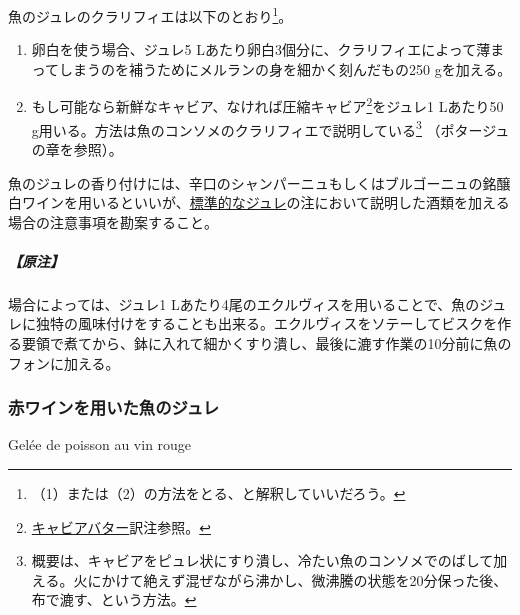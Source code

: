 \begin{recette}
魚のジュレのクラリフィエは以下のとおり\footnote{（1）または（2）の方法をとる、と解釈していいだろう。}。

\begin{enumerate}
\def\labelenumi{\arabic{enumi}.}
\item
  卵白を使う場合、ジュレ5
  Lあたり卵白3個分に、クラリフィエによって薄まってしまうのを補うためにメルランの身を細かく刻んだもの250
  gを加える。
\item
  もし可能なら新鮮なキャビア、なければ圧縮キャビア\footnote{\protect\hyperlink{beurre-de-caviar}{キャビアバター}訳注参照。}をジュレ1
  Lあたり50
  g用いる。方法は魚のコンソメのクラリフィエで説明している\footnote{概要は、キャビアをピュレ状にすり潰し、冷たい魚のコンソメでのばして加える。火にかけて絶えず混ぜながら沸かし、微沸騰の状態を20分保った後、布で漉す、という方法。}
  （ポタージュの章を参照）。
\end{enumerate}

魚のジュレの香り付けには、辛口のシャンパーニュもしくはブルゴーニュの銘醸白ワインを用いるといいが、\protect\hyperlink{gelees-ordinaires}{標準的なジュレ}の注において説明した酒類を加える場合の注意事項を勘案すること。

\hypertarget{nota-gelee-de-poisson-blanche}{%
\subparagraph{【原注】}\label{nota-gelee-de-poisson-blanche}}

場合によっては、ジュレ1
Lあたり4尾のエクルヴィスを用いることで、魚のジュレに独特の風味付けをすることも出来る。エクルヴィスをソテーしてビスクを作る要領で煮てから、鉢に入れて細かくすり潰し、最後に漉す作業の10分前に魚のフォンに加える。

\atoaki{}

\hypertarget{gelee-de-poisson-au-vin-rouge}{%
\subsubsection{赤ワインを用いた魚のジュレ}\label{gelee-de-poisson-au-vin-rouge}}

\begin{frsubenv}

Gelée de poisson au vin rouge

\end{frsubenv}



\end{recette}
